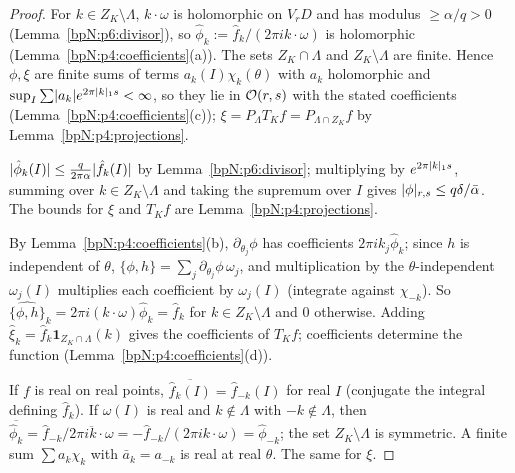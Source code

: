 \begin{proof}
\label{stepN:p6:hom-def} For $k\in Z_K\setminus\Lambda$, $k\cdot\omega$ is holomorphic on $V_rD$ and has modulus $\ge\alpha/q>0$ (Lemma~\ref{bpN:p6:divisor}), so $\hat\phi_k:=\hat f_k/(2\pi ik\cdot\omega)$ is holomorphic (Lemma~\ref{bpN:p4:coefficients}(a)). The sets $Z_K\cap\Lambda$ and $Z_K\setminus\Lambda$ are finite. Hence $\phi,\xi$ are finite sums of terms $a_k(I)\chi_k(\theta)$ with $a_k$ holomorphic and $\sup_I\sum\lvert a_k\rvert e^{2\pi\lvert k\rvert_1s}<\infty$, so they lie in $\mathcal O(r,s)$ with the stated coefficients (Lemma~\ref{bpN:p4:coefficients}(c)); $\xi=P_\Lambda T_Kf=P_{\Lambda\cap Z_K}f$ by Lemma~\ref{bpN:p4:projections}.

\label{stepN:p6:hom-norm} $\lvert \hat\phi_k(I)\rvert\le\frac{q}{2\pi\alpha}\lvert \hat f_k(I)\rvert$ by Lemma~\ref{bpN:p6:divisor}; multiplying by $e^{2\pi\lvert k\rvert_1s}$, summing over $k\in Z_K\setminus\Lambda$ and taking the supremum over $I$ gives $\lvert \phi\rvert_{r,s}\le q\delta/\bar\alpha$. The bounds for $\xi$ and $T_Kf$ are Lemma~\ref{bpN:p4:projections}.

\label{stepN:p6:hom-eq} By Lemma~\ref{bpN:p4:coefficients}(b), $\partial_{\theta_j}\phi$ has coefficients $2\pi ik_j\hat\phi_k$; since $h$ is independent of $\theta$, $\{\phi,h\}=\sum_j\partial_{\theta_j}\phi\,\omega_j$, and multiplication by the $\theta$-independent $\omega_j(I)$ multiplies each coefficient by $\omega_j(I)$ (integrate against $\chi_{-k}$). So $\widehat{\{\phi,h\}}_k=2\pi i(k\cdot\omega)\hat\phi_k=\hat f_k$ for $k\in Z_K\setminus\Lambda$ and $0$ otherwise. Adding $\hat\xi_k=\hat f_k\mathbf 1_{Z_K\cap\Lambda}(k)$ gives the coefficients of $T_Kf$; coefficients determine the function (Lemma~\ref{bpN:p4:coefficients}(d)).

\label{stepN:p6:hom-real} If $f$ is real on real points, $\overline{\hat f_k(I)}=\hat f_{-k}(I)$ for real $I$ (conjugate the integral defining $\hat f_k$). If $\omega(I)$ is real and $k\notin\Lambda$ with $-k\notin\Lambda$, then $\overline{\hat\phi_k}=\hat f_{-k}/\overline{2\pi ik\cdot\omega}=-\hat f_{-k}/(2\pi ik\cdot\omega)=\hat\phi_{-k}$; the set $Z_K\setminus\Lambda$ is symmetric. A finite sum $\sum a_k\chi_k$ with $\bar a_k=a_{-k}$ is real at real $\theta$. The same for $\xi$.
\end{proof}

